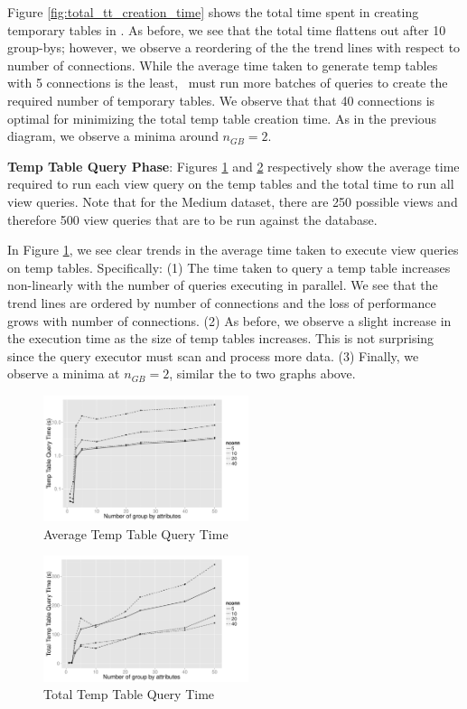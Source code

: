 Figure \ref{fig:total_tt_creation_time} shows the total time spent in creating
temporary tables in \VizRecDB. As before, we see that the total time
flattens out after 10 group-bys; however, we observe a reordering of the the
trend lines with respect to number of connections. While the average time taken
to generate temp tables with 5 connections is the least, \VizRecDB\ must run more
batches of queries to create the required number of temporary tables. We observe
that that 40 connections is optimal for minimizing the total temp table creation
time. As in the previous diagram, we observe a minima around $n_{GB}=2$.

{\bf Temp Table Query Phase}: Figures \ref{fig:avg_tt_query_time} and
\ref{fig:total_tt_query_time} respectively show the average time required to run
each view query on the temp tables and the total time to run all view queries.
Note that for the Medium dataset, there are 250 possible views and therefore 500
view queries that are to be run against the database.

In Figure \ref{fig:avg_tt_query_time}, we see clear trends in  the average time
taken to execute view queries on temp tables. Specifically: (1) The time taken
to query a temp table increases non-linearly with the number of queries
executing in parallel. We see that the trend lines are ordered by number of
connections and the loss of performance grows with number of connections. (2) As
before, we observe a slight increase in the execution time as the size of temp
tables increases. This is not surprising since the query executor must scan and
process more data. (3) Finally, we observe a minima at $n_{GB}=2$, similar the to
two graphs above.


\begin{figure}[h]
  \centering
    \includegraphics[width=6cm]{Images/mult_gb_tt_query_single.pdf}
  \caption{Average Temp Table Query Time}
  \label{fig:avg_tt_query_time}
\end{figure}

\begin{figure}[h]
  \centering
    \includegraphics[width=6cm]{Images/mult_gb_tt_query_total.pdf}
     \caption{Total Temp Table Query Time} 
       \label{fig:total_tt_query_time}
\end{figure}

